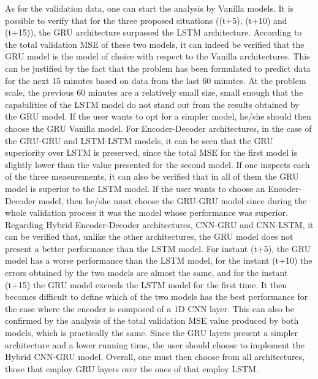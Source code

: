 As for the validation data, one can start the analysis by Vanilla models. It is possible to verify that for the three proposed situations ((t+5), (t+10) and (t+15)), the \ac{GRU} architecture surpassed the \ac{LSTM} architecture. According to the total validation \ac{MSE} of these two models, it can indeed be verified that the \ac{GRU} model is the model of choice with respect to the Vanilla architectures. This can be justified by the fact that the problem has been formulated to predict data for the next 15 minutes based on data from the last 60 minutes. At the problem scale, the previous 60 minutes are a relatively small size, small enough that the capabilities of the \ac{LSTM} model do not stand out from the results obtained by the \ac{GRU} model. If the user wants to opt for a simpler model, he/she should then choose the \ac{GRU} Vanilla model. For Encoder-Decoder architectures, in the case of the \ac{GRU}-\ac{GRU} and \ac{LSTM}-\ac{LSTM} models, it can be seen that the \ac{GRU} superiority over \ac{LSTM} is preserved, since the total \ac{MSE} for the first model is slightly lower than the value presented for the second model. If one inspects each of the three measurements, it can also be verified that in all of them the \ac{GRU} model is superior to the \ac{LSTM} model. If the user wants to choose an Encoder-Decoder model, then he/she must choose the \ac{GRU}-\ac{GRU}  model since during the whole validation process it was the model whose performance was superior. Regarding Hybrid Encoder-Decoder architectures, \acs{CNN}-\ac{GRU} and \acs{CNN}-\ac{LSTM}, it can be verified that, unlike the other architectures, the \ac{GRU} model does not present a better performance than the \ac{LSTM} model. For instant (t+5), the GRU model has a worse performance than the \ac{LSTM} model, for the instant (t+10) the errors obtained by the two models are almost the same, and for the instant (t+15) the \ac{GRU} model exceeds the \ac{LSTM} model for the first time. It then becomes difficult to define which of the two models has the best performance for the case where the encoder is composed of a \ac{1D CNN} layer. This can also be confirmed by the analysis of the total validation \ac{MSE} value produced by both models, which is practically the same. Since the \ac{GRU} layers present a simpler architecture and a lower running time, the user should choose to implement the Hybrid \ac{CNN}-\ac{GRU} model. Overall, one must then choose from all architectures, those that employ \ac{GRU} layers over the ones of that employ \ac{LSTM}.

